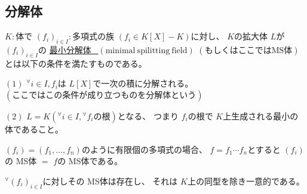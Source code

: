 \documentclass[../master_galois_theory]{subfiles}
\begin{document}
\subsection{分解体}

\begin{defi}
  $K:$体で $(f_i)_{i \in I}:$多項式の族 $(f_i \in K[X] - K)$に対し、
  $K$の拡大体 $L$が $(f_i)_{i \in I}$の
  \underline{最小分解体 \  $(\mathrm{minimal \  spilitting \  field})$}
  $(もしくはここでは \mathrm{MS}体)$とは以下の条件を満たすものである。

  $(1)$
  ${}^\forall i \in I , f_i$は $L[X]$で一次の積に分解される。
  $(ここではこの条件が成り立つものを分解体という)$

  $(2)$
  $L = K({}^\forall i \in I , {}^\forall f_i の根)$となる、
  つまり $f_i$の根で $K$上生成される最小の体であること。
\end{defi}

\begin{rem}
  $(f_i) = (f_1 , \dots , f_n)$のように有限個の多項式の場合、
  $f = f_1 \cdots f_n$とすると
  $(f_i)$の \rm{MS}体 $=$ $f$の \rm{MS}体である。
\end{rem}

\begin{prop}
  ${}^\forall (f_i)_{i \in I}$に対しその \rm{MS}体は存在し、
  それは $K$上の同型を除き一意的である。
\end{prop}
\end{document}
